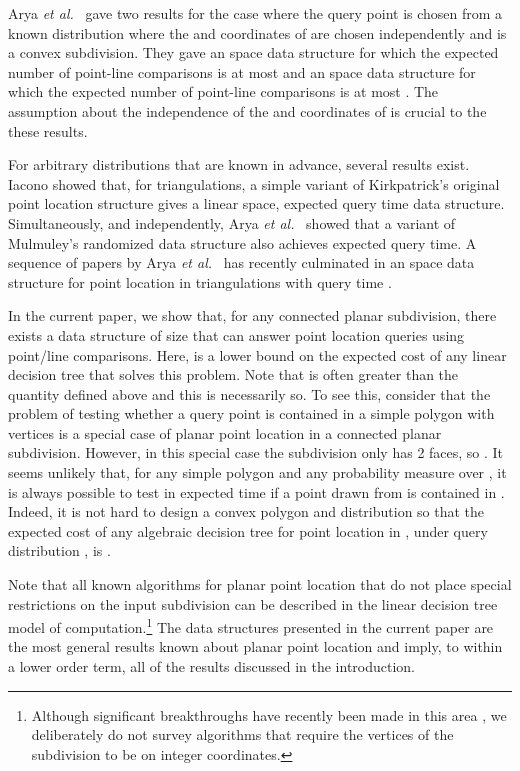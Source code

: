 \documentclass[lotsofwhite]{patmorin}
\newcommand{\etal}{\emph{et al.}}
\begin{document}
Arya \etal\ \cite{acmr00} gave two results for the case where the
query point  is chosen from a known distribution where the  and
 coordinates of  are chosen independently and  is a convex
subdivision.  They gave an  space data structure for which the
expected number of point-line comparisons is at most  and an
 space data structure for which the expected number of
point-line comparisons is at most .  The assumption about the
independence of the  and  coordinates of  is crucial to the
these results.

For arbitrary distributions that are known in advance, several results
exist.  Iacono \cite{i01,i04} showed that, for triangulations, a
simple variant of Kirkpatrick's original point location structure
gives a linear space,  expected query time data structure.
Simultaneously, and independently, Arya \etal\ \cite{amm01b} showed
that a variant of Mulmuley's randomized data structure also achieves
 expected query time.  A sequence of papers by Arya \etal\
\cite{amm00,amm01a,ammw07} has recently culminated in an  space
data structure for point location in triangulations with query time
 \cite{ammw07}.

In the current paper, we show that, for any connected planar
subdivision, there exists a data structure of size  that can
answer point location queries using 
point/line comparisons.  Here,  is a lower
bound on the expected cost of any linear decision tree that solves
this problem.  Note that  is often greater than the quantity
 defined above and this is necessarily so.  To see this, consider
that the problem of testing whether a query point is contained in a
simple polygon  with  vertices is a special case of planar point
location in a connected planar subdivision.  However, in this special
case the subdivision only has 2 faces, so .  It seems unlikely
that, for any simple polygon  and any probability measure  over ,
it is always possible to test in  expected time if a point
 drawn from  is contained in .  Indeed, it is not hard to
design a convex polygon  and distribution  so that the expected
cost of any algebraic decision tree for point location in , under
query distribution , is .

Note that all known algorithms for planar point location that do not
place special restrictions on the input subdivision can be described
in the linear decision tree model of computation.\footnote{Although
significant breakthroughs have recently been made in this area
\cite{c06,p06}, we deliberately do not survey algorithms that require
the vertices of the subdivision to be on integer coordinates.}  The
data structures presented in the current paper are the most general
results known about planar point location and imply, to within a
lower order term, all of the results discussed in the introduction.
\end{document}
